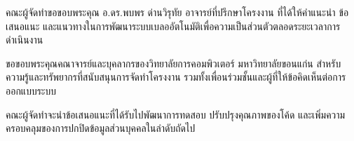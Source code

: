 คณะผู้จัดทำขอขอบพระคุณ อ.ดร.พบพร ด่านวิรุทัย อาจารย์ที่ปรึกษาโครงงาน ที่ได้ให้คำแนะนำ ข้อเสนอแนะ และแนวทางในการพัฒนาระบบเบลออัตโนมัติเพื่อความเป็นส่วนตัวตลอดระยะเวลาการดำเนินงาน

ขอขอบพระคุณคณาจารย์และบุคลากรของวิทยาลัยการคอมพิวเตอร์ มหาวิทยาลัยขอนแก่น สำหรับความรู้และทรัพยากรที่สนับสนุนการจัดทำโครงงาน รวมทั้งเพื่อนร่วมชั้นและผู้ที่ให้ข้อคิดเห็นต่อการออกแบบระบบ

คณะผู้จัดทำจะนำข้อเสนอแนะที่ได้รับไปพัฒนาการทดสอบ ปรับปรุงคุณภาพของโค้ด และเพิ่มความครอบคลุมของการปกปิดข้อมูลส่วนบุคคลในลำดับถัดไป
